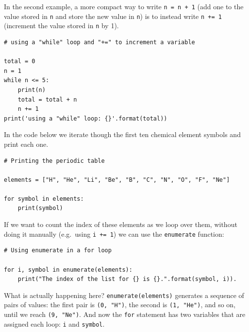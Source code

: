 \documentclass[a4paper]{article}
\begin{document}
In the second example, a more compact way to write \texttt{n = n + 1} (add one to the value stored in \texttt{n} and store the new value in \texttt{n}) is to instead write \texttt{n += 1} (increment the value stored in \texttt{n} by 1).
\begin{lstlisting}
# using a "while" loop and "+=" to increment a variable

total = 0
n = 1
while n <= 5:
    print(n)
    total = total + n
    n += 1
print('using a "while" loop: {}'.format(total))
\end{lstlisting}

In the code below we iterate though the first ten chemical element symbols and print each one.
\begin{lstlisting}
# Printing the periodic table

elements = ["H", "He", "Li", "Be", "B", "C", "N", "O", "F", "Ne"]

for symbol in elements:
	print(symbol)
\end{lstlisting}
If we want to count the index of these elements as we loop over them, without doing it manually (e.g.\ using \texttt{i += 1}) we can use the \texttt{enumerate} function:
\begin{lstlisting}
# Using enumerate in a for loop

for i, symbol in enumerate(elements):
	print("The index of the list for {} is {}.".format(symbol, i)).
\end{lstlisting}
What is actually happening here? \texttt{enumerate(elements)} generates a sequence of pairs of values: the first pair is \texttt{(0, "H")}, the second is \texttt{(1, "He")}, and so on, until we reach \texttt{(9, "Ne")}. And now the \texttt{for} statement has two variables that are assigned each loop: \texttt{i} and \texttt{symbol}.

\vspace{\baselineskip}
\begin{center}
	\noindent{}
\end{center}
\end{document}
